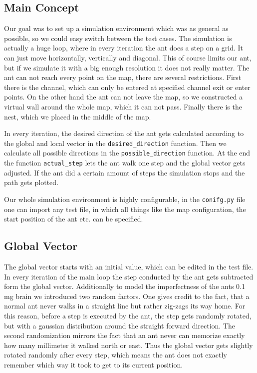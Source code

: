 \documentclass[11pt]{article}
\begin{document}
	\subsection{Main Concept}
		Our goal was to set up a simulation environment which was as general as possible, so we could easy switch between the test cases. The simulation is actually a huge loop, where in every iteration the ant does a step on a grid. It can just move horizontally, vertically and diagonal. This of course limits our ant, but if we simulate it with a big enough resolution it does not really matter. The ant can not reach every point on the map, there are several restrictions. First there is the channel, which can only be entered at specified channel exit or enter points. On the other hand the ant can not leave the map, so we constructed a virtual wall around the whole map, which it can not pass. Finally there is the nest, which we placed in the middle of the map.

In every iteration, the desired direction of the ant gets calculated according to the global and local vector in the \texttt{desired\_direction} function. Then we calculate all possible directions in the \texttt{possible\_direction} function. At the end the function \texttt{actual\_step} lets the ant walk one step and the global vector gets adjusted. If the ant did a certain amount of steps the simulation stops and the path gets plotted.

Our whole simulation environment is highly configurable, in the \texttt{conifg.py} file one can import any test file, in which all things like the map configuration, the start position of the ant etc. can be specified.
	\subsection{Global Vector}
		The global vector starts with an initial value, which can be edited in the test file. In every iteration of the main loop the step conducted by the ant gets subtracted form the global vector. Additionally to model the imperfectness of the ants 0.1 mg brain we introduced two random factors. One gives credit to the fact, that a normal ant never walks in a straight line but rather zig-zags its way home. For this reason, before a step is executed by the ant, the step gets randomly rotated, but with a gaussian distribution around the straight forward direction. The second randomization mirrors the fact that an ant never can memorize exactly how many millimeter it walked north or east. Thus the global vector gets slightly rotated randomly after every step, which means the ant does not exactly remember which way it took to get to its current position.
\end{document}
